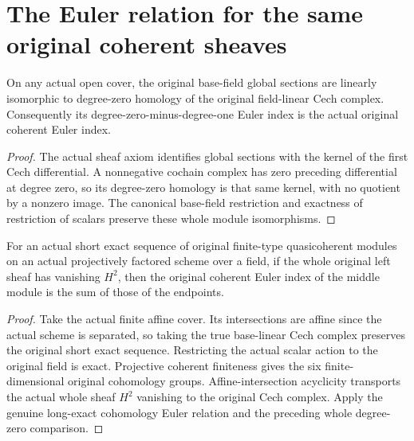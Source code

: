 \section{The Euler relation for the same original coherent sheaves}

\begin{theorem}
\label{thm:fc-scheme-coherent-euler-zero}
\leanok
{}
On any actual open cover, the original base-field global sections are
linearly isomorphic to degree-zero homology of the original field-linear
Cech complex. Consequently its degree-zero-minus-degree-one Euler index
is the actual original coherent Euler index.
\end{theorem}
\begin{proof}
The actual sheaf axiom identifies global sections with the kernel of
the first Cech differential. A nonnegative cochain complex has zero
preceding differential at degree zero, so its degree-zero homology is
that same kernel, with no quotient by a nonzero image. The canonical
base-field restriction and exactness of restriction of scalars preserve
these whole module isomorphisms.
\end{proof}

\begin{theorem}
\label{thm:fc-scheme-coherent-euler-exact}
\leanok
{}
For an actual short exact sequence of original finite-type quasicoherent
modules on an actual projectively factored scheme over a field, if the
whole original left sheaf has vanishing $H^2$, then the original coherent
Euler index of the middle module is the sum of those of the endpoints.
\end{theorem}
\begin{proof}
Take the actual finite affine cover. Its intersections are affine since
the actual scheme is separated, so taking the true base-linear Cech
complex preserves the original short exact sequence. Restricting the
actual scalar action to the original field is exact. Projective coherent
finiteness gives the six finite-dimensional original cohomology groups.
Affine-intersection acyclicity transports the actual whole sheaf $H^2$
vanishing to the original Cech complex. Apply the genuine long-exact
cohomology Euler relation and the preceding whole degree-zero comparison.
\end{proof}
